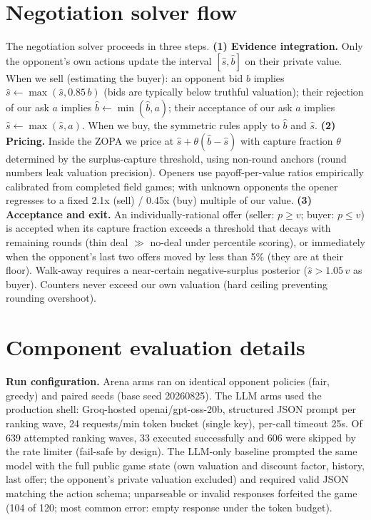 \documentclass{article}
\begin{document}
\section{Negotiation solver flow}
\label{app:negotiation}
The negotiation solver proceeds in three steps. \textbf{(1) Evidence integration.} Only the opponent's own actions update the interval $[\hat{s}, \hat{b}]$ on their private value. When we sell (estimating the buyer): an opponent bid $b$ implies $\hat{s} \leftarrow \max(\hat{s}, 0.85\,b)$ (bids are typically below truthful valuation); their rejection of our ask $a$ implies $\hat{b} \leftarrow \min(\hat{b}, a)$; their acceptance of our ask $a$ implies $\hat{s} \leftarrow \max(\hat{s}, a)$. When we buy, the symmetric rules apply to $\hat{b}$ and $\hat{s}$. \textbf{(2) Pricing.} Inside the ZOPA we price at $\hat{s} + \theta(\hat{b}-\hat{s})$ with capture fraction $\theta$ determined by the surplus-capture threshold, using non-round anchors (round numbers leak valuation precision). Openers use payoff-per-value ratios empirically calibrated from completed field games; with unknown opponents the opener regresses to a fixed 2.1x (sell) / 0.45x (buy) multiple of our value. \textbf{(3) Acceptance and exit.} An individually-rational offer (seller: $p \ge v$; buyer: $p \le v$) is accepted when its capture fraction exceeds a threshold that decays with remaining rounds (thin deal $\gg$ no-deal under percentile scoring), or immediately when the opponent's last two offers moved by less than 5\% (they are at their floor). Walk-away requires a near-certain negative-surplus posterior ($\hat{s} > 1.05\,v$ as buyer). Counters never exceed our own valuation (hard ceiling preventing rounding overshoot).

\section{Component evaluation details}
\label{app:components}
\textbf{Run configuration.} Arena arms ran on identical opponent policies (fair, greedy) and paired seeds (base seed 20260825). The LLM arms used the production shell: Groq-hosted openai/gpt-oss-20b, structured JSON prompt per ranking wave, 24 requests/min token bucket (single key), per-call timeout 25s. Of 639 attempted ranking waves, 33 executed successfully and 606 were skipped by the rate limiter (fail-safe by design). The LLM-only baseline prompted the same model with the full public game state (own valuation and discount factor, history, last offer; the opponent's private valuation excluded) and required valid JSON matching the action schema; unparseable or invalid responses forfeited the game (104 of 120; most common error: empty response under the token budget).
\end{document}
